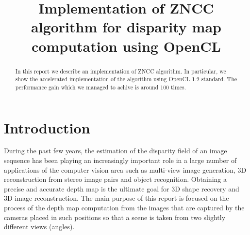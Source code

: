 \documentclass[conference]{IEEEtran}
\begin{document}
%

\title{Implementation of ZNCC algorithm for disparity map computation using OpenCL}

\author{
    \and
}


\maketitle


\begin{abstract}
In this report we describe an implementation of ZNCC algorithm. In particular, we show the accelerated implementation of the algorithm using OpenCL 1.2 standard. The performance gain which we managed to achive is around 100 times.
\end{abstract}


\section{Introduction}
During the past few years, the estimation of the disparity field of an image sequence has been playing an increasingly important role in a large number of applications of the computer vision area such as multi-view image generation, 3D reconstruction from stereo image pairs and object recognition. Obtaining a precise and accurate depth map is the ultimate goal for 3D shape recovery and 3D image reconstruction. The main purpose of this report is focused on the process of the depth map computation from the images that are captured by the cameras placed in such positions so that a scene is taken from two slightly different views (angles). 
\end{document}
